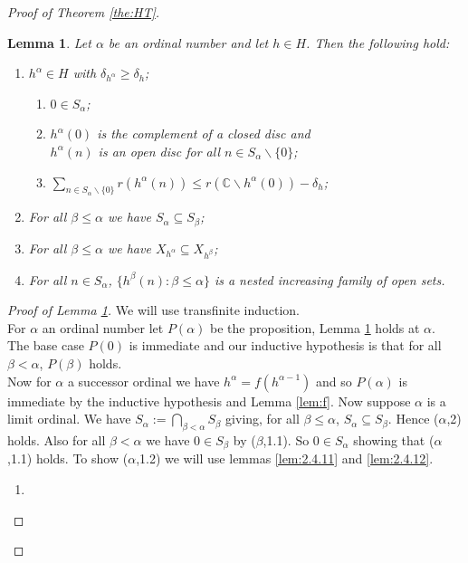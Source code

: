 \documentclass{strippedproc-l}
\newtheorem{lemma}[theorem]{Lemma}
\theoremstyle{definition}
\theoremstyle{remark}
\numberwithin{equation}{section}
\begin{document}
\begin{proof}[Proof of Theorem \ref{the:HT}]
\begin{lemma}
Let $\alpha$ be an ordinal number and let $h\in H$. Then the following hold:
\begin{enumerate}
\item[\textup{($\alpha$,1)}]
$h^{\alpha}\in H$ with $\delta_{h^{\alpha}}\geq\delta_{h}$;
\begin{enumerate}
\item[\textup{($\alpha$,1.1)}]
$0\in S_{\alpha}$;
\item[\textup{($\alpha$,1.2)}]
$h^{\alpha}(0)$ is the complement of a closed disc and\\ 
$h^{\alpha}(n)$ is an open disc for all $n\in S_{\alpha}\backslash\{0\}$;
\item[\textup{($\alpha$,1.3)}]
$\sum_{n\in S_{\alpha}\backslash \{0\}}r(h^{\alpha}(n))\le r(\mathbb{C}\backslash h^{\alpha}(0))-\delta_{h}$;
\end{enumerate}
\item[\textup{($\alpha$,2)}]
For all $\beta\le\alpha$ we have $S_{\alpha}\subseteq S_{\beta}$; 
\item[\textup{($\alpha$,3)}]
For all $\beta\le\alpha$ we have $X_{h^{\alpha}}\subseteq X_{h^{\beta}}$;
\item[\textup{($\alpha$,4)}]
For all $n\in S_{\alpha}$, $\{h^{\beta}(n):\beta\le\alpha\}$ is a nested increasing family of open sets.
\end{enumerate}
\label{lem:h ord}
\end{lemma}
\begin{proof}[Proof of Lemma \ref{lem:h ord}] We will use transfinite induction.\\
For $\alpha$ an ordinal number let $P(\alpha)$ be the proposition, Lemma \ref{lem:h ord} holds at $\alpha$.\\
The base case $P(0)$ is immediate and our inductive hypothesis is that for all $\beta<\alpha$, $P(\beta)$ holds.\\
Now for $\alpha$ a successor ordinal we have $h^{\alpha}=f(h^{\alpha-1})$ and so $P(\alpha)$ is immediate by the inductive hypothesis and Lemma \ref{lem:f}. Now suppose $\alpha$ is a limit ordinal. 
We have $S_{\alpha}:=\bigcap_{\beta<\alpha}S_{\beta}$ giving, for all $\beta\le\alpha$, $S_{\alpha}\subseteq S_{\beta}$. Hence ($\alpha$,2) holds. Also for all $\beta<\alpha$ we have $0\in S_{\beta}$ by ($\beta$,1.1). So $0\in S_{\alpha}$ showing that ($\alpha$,1.1) holds. To show ($\alpha$,1.2) we will use lemmas \ref{lem:2.4.11} and \ref{lem:2.4.12}.
\begin{enumerate}
\item[\textup{(i)}]

\end{enumerate}
\end{proof}
\end{proof}
\end{document}
